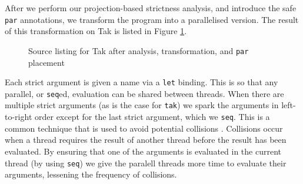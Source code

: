 After we perform our projection-based strictness analysis, and introduce the
safe \verb-par- annotations, we transform the program into a parallelised
version. The result of this transformation on Tak is listed in Figure
\ref{fig:takParred}.

\begin{figure}[!h]
  
\caption{Source listing for Tak after analysis, transformation, and \texttt{par} placement}
\label{fig:takParred}
\end{figure}

Each strict argument is given a name via a \verb-let- binding. This is so that
any parallel, or \verb-seq-ed, evaluation can be shared between threads. When
there are multiple strict arguments (as is the case for \verb-tak-) we spark
the arguments in left-to-right order except for the last strict argument, which
we \verb-seq-. This is a common technique that is used to avoid potential
collisions \citep{strategies}. Collisions occur when a thread requires the
result of another thread before the result has been evaluated. By ensuring that
one of the arguments is evaluated in the current thread (by using \texttt{seq})
we give the paralell threads more time to evaluate their arguments, lessening
the frequency of collisions.

%
%
%

%


